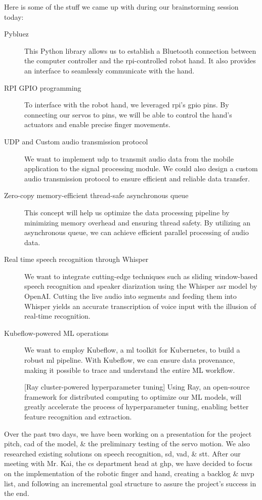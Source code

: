 Here is some of the stuff we came up with during our brainstorming session today:
\begin{description}
\item[Pybluez] This Python library allows us to establish a Bluetooth connection between the computer controller and the \gls{rpi}-controlled robot hand. It also provides an interface to seamlessly communicate with the hand.

\item[RPI GPIO programming] To interface with the robot hand, we leveraged \gls{rpi}'s \gls{gpio} pins. By connecting our servos to pins, we will be able to control the hand's actuators and enable precise finger movements.

\item[UDP and Custom audio transmission protocol] We want to implement \gls{udp} to transmit audio data from the mobile application to the signal processing module. We could also design a custom audio transmission protocol to ensure efficient and reliable data transfer.

\item[Zero-copy memory-efficient thread-safe asynchronous queue] This concept will help us optimize the data processing pipeline by minimizing memory overhead and ensuring thread safety. By utilizing an asynchronous queue, we can achieve efficient parallel processing of audio data.

\item[Real time speech recognition through Whisper] We want to integrate cutting-edge techniques such as sliding window-based speech recognition and speaker diarization using the Whisper \gls{asr} model by OpenAI. Cutting the live audio into segments and feeding them into Whisper yields an accurate transcription of voice input with the illusion of real-time recognition.

\item[Kubeflow-powered ML operations] We want to employ Kubeflow, a \gls{ml} toolkit for Kubernetes, to build a robust \gls{ml} pipeline. With Kubeflow, we can ensure data provenance, making it possible to trace and understand the entire ML workflow.

[Ray cluster-powered hyperparameter tuning] Using Ray, an open-source framework for distributed computing to optimize our ML models, will greatly accelerate the process of hyperparameter tuning, enabling better feature recognition and extraction.
\end{description}
\newpage


Over the past two days, we have been working on a presentation for the project pitch, \gls{cad} of the model, \& the preliminary testing of the servo motion. We also researched existing solutions on speech recognition, \gls{sd}, \gls{vad}, \& \gls{stt}. After our meeting with Mr. Kai, the \gls{cs} department head at \gls{ghp}, we have decided to focus on the implementation of the robotic finger and hand, creating a backlog \& \gls{mvp} list, and following an incremental goal structure to assure the project's success in the end.

\newpage